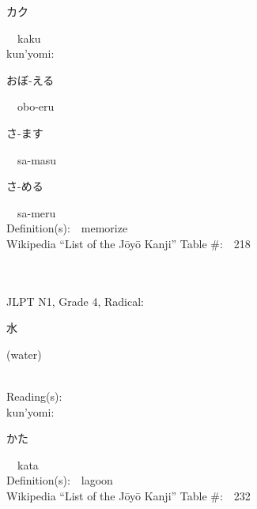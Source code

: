 \begin{multicols}{2}
{\hspace*{2em}}{\begin{CJK}{UTF8}{min} カク \end{CJK}}\ \ kaku\ \ \\
{\hspace*{1em}}kun'yomi:\ \ \\
{\hspace*{2em}}{\begin{CJK}{UTF8}{min} おぼ-える \end{CJK}}\ \ obo-eru\ \ \\
{\hspace*{2em}}{\begin{CJK}{UTF8}{min} さ-ます \end{CJK}}\ \ sa-masu\ \ \\
{\hspace*{2em}}{\begin{CJK}{UTF8}{min} さ-める \end{CJK}}\ \ sa-meru\ \ \\
Definition(s):\ \ memorize \\
Wikipedia ``List of the J\=oy\=o Kanji'' Table \#:\ \ 218 \\
\ \ \\
{\fontsize{34pt}{40pt}  }\ \ \\  %
{JLPT N1, Grade 4, Radical:\ \ {\begin{CJK}{UTF8}{min} 水 \end{CJK}} (water) } \\
Reading(s):\ \ \\
{\hspace*{1em}}kun'yomi:\ \ \\
{\hspace*{2em}}{\begin{CJK}{UTF8}{min} かた \end{CJK}}\ \ kata\ \ \\
Definition(s):\ \ lagoon \\
Wikipedia ``List of the J\=oy\=o Kanji'' Table \#:\ \ 232 \\
\ \ \\
{\fontsize{34pt}{40pt}  }\ \ \\  %

\end{multicols}
